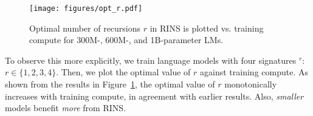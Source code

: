 \begin{figure}[t]
    \centering
    \texttt{[image: figures/opt\_r.pdf]}
    \caption{Optimal number of recursions  $r$ in RINS is plotted vs. training compute for 300M-, 600M-, and 1B-parameter LMs.}
    \label{fig:optr}
\end{figure}

To observe this more explicitly, we train language models with four signatures \A$^r$\B: $r\in\{1,2,3,4\}$. Then, we plot the optimal value of $r$ against training compute. As shown from the results in Figure~\ref{fig:optr}, the optimal value of $r$ monotonically increases with training compute, in agreement with earlier results. Also, \emph{smaller} models benefit \emph{more} from RINS.%
